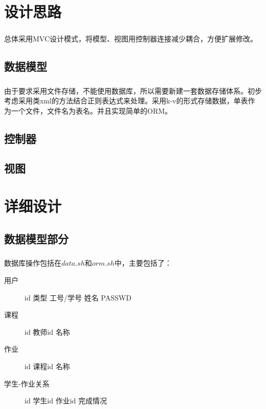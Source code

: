 \documentclass[notitlepage,cs4size,punct,oneside]{report}
\begin{document}
\begin{CJK}{UTF8}{hei}
\begin{description}
\end{description}


\chapter{设计思路}
\paragraph{}总体采用MVC设计模式，将模型、视图用控制器连接减少耦合，方便扩展修改。
\section{数据模型}
\paragraph{}由于要求采用文件存储，不能使用数据库，所以需要新建一套数据存储体系。初步考虑采用类xml的方法结合正则表达式来处理。采用k-v的形式存储数据，单表作为一个文件，文件名为表名。并且实现简单的ORM。
\section{控制器}
\paragraph{}
\section{视图}
\paragraph{}

\chapter{详细设计}
\section{数据模型部分}
\paragraph{}数据库操作包括在$data.sh$和$orm.sh$中，主要包括了：
\begin{description}
    \item [用户] id 类型 工号/学号 姓名 PASSWD
    \item [课程] id 教师id 名称
    \item [作业] id 课程id 名称
    \item [学生-作业关系] id 学生id 作业id 完成情况
\end{description}

\end{CJK}
\end{document}

